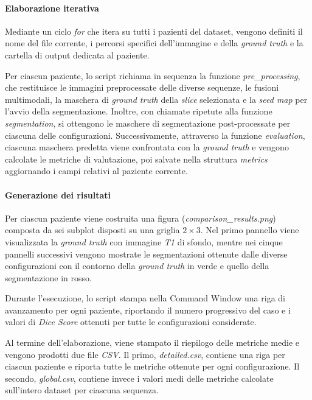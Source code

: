 \paragraph{Elaborazione iterativa}
Mediante un ciclo \textit{for} che itera su tutti i pazienti del dataset, vengono definiti il nome del file corrente, i percorsi specifici dell’immagine e della \textit{ground truth} e la cartella di output dedicata al paziente.

Per ciascun paziente, lo script richiama in sequenza la funzione \textit{pre\_processing}, che restituisce le immagini preprocessate delle diverse sequenze, le fusioni multimodali, la maschera di \textit{ground truth} della \textit{slice} selezionata e la \textit{seed map} per l'avvio della segmentazione. Inoltre, con chiamate ripetute alla funzione \textit{segmentation}, si ottengono le maschere di segmentazione post-processate per ciascuna delle configurazioni. Successivamente, attraverso la funzione \textit{evaluation}, ciascuna maschera predetta viene confrontata con la \textit{ground truth} e vengono calcolate le metriche di valutazione, poi salvate nella struttura \textit{metrics} aggiornando i campi relativi al paziente corrente.

\paragraph{Generazione dei risultati}
Per ciascun paziente viene costruita una figura (\textit{comparison\_results.png}) composta da sei subplot disposti su una griglia \(2 \times 3\). Nel primo pannello viene visualizzata la \textit{ground truth} con immagine \textit{T1} di sfondo, mentre nei cinque pannelli successivi vengono mostrate le segmentazioni ottenute dalle diverse configurazioni con il contorno della \textit{ground truth} in verde e quello della segmentazione in rosso.

Durante l’esecuzione, lo script stampa nella Command Window una riga di avanzamento per ogni paziente, riportando il numero progressivo del caso e i valori di \textit{Dice Score} ottenuti per tutte le configurazioni considerate.

Al termine dell’elaborazione, viene stampato il riepilogo delle metriche medie e vengono prodotti due file \textit{CSV}. Il primo, \textit{detailed.csv}, contiene una riga per ciascun paziente e riporta tutte le metriche ottenute per ogni configurazione. Il secondo, \textit{global.csv}, contiene invece i valori medi delle metriche calcolate sull’intero dataset per ciascuna sequenza.


